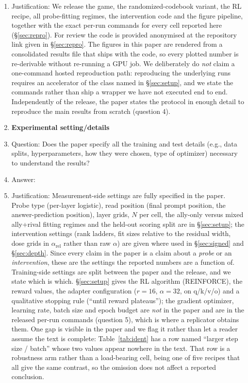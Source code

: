 \begin{enumerate}
    \item[] Justification: We release the game, the randomized-codebook variant, the RL recipe, all probe-fitting regimes, the intervention code and the figure pipeline, together with the exact per-run commands for every cell reported here (\S\ref{sec:repro}). For review the code is provided anonymised at the repository link given in \S\ref{sec:repro}. The figures in this paper are rendered from a consolidated results file that ships with the code, so every plotted number is re-derivable without re-running a GPU job. We deliberately do \emph{not} claim a one-command hosted reproduction path: reproducing the underlying runs requires an accelerator of the class named in \S\ref{sec:setup}, and we state the commands rather than ship a wrapper we have not executed end to end. Independently of the release, the paper states the protocol in enough detail to reproduce the main results from scratch (question 4).
\item {\bf Experimental setting/details}
    \item[] Question: Does the paper specify all the training and test details (e.g., data splits, hyperparameters, how they were chosen, type of optimizer) necessary to understand the results?
    \item[] Answer: \answerYes{}
    \item[] Justification: Measurement-side settings are fully specified in the paper. Probe type (per-layer logistic), read position (final prompt position, the answer-prediction position), layer grids, $N$ per cell, the ally-only versus mixed ally+rival fitting regimes and the held-out scoring split are in \S\ref{sec:setup}; the intervention settings (rank ladders, fit sizes relative to the residual width, dose grids in $\alpha_{\mathrm{rel}}$ rather than raw $\alpha$) are given where used in \S\ref{sec:signed} and \S\ref{sec:depth}. Since every claim in the paper is a claim about a \emph{probe} or an \emph{intervention}, these are the settings the reported numbers are a function of. Training-side settings are split between the paper and the release, and we state which is which. \S\ref{sec:setup} gives the RL algorithm (REINFORCE), the reward values, the adapter configuration ($r{=}16$, $\alpha{=}32$, on q/k/v/o) and a qualitative stopping rule (``until reward plateaus''); the gradient optimizer, learning rate, batch size and epoch budget are \emph{not} in the paper and are in the released per-run commands (question 5), which is where a replicator obtains them. One gap is visible in the paper and we flag it rather than let a reader assume the text is complete: Table~\ref{tab:ident} has a row named ``larger step size / batch'' whose two values appear nowhere in the text. That row is a robustness arm rather than a load-bearing cell, being one of five recipes that all give the same contrast, so the omission does not affect a reported conclusion.

\end{enumerate}

